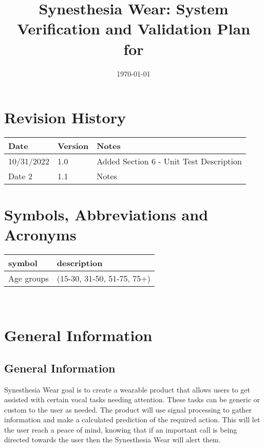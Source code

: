 \documentclass[12pt, titlepage]{article}
\begin{document}
\title{Synesthesia Wear: System Verification and Validation Plan for \progname{}} 
\author{\authname}
\date{\today}
	
\maketitle


\section{Revision History}

\begin{tabularx}{\textwidth}{p{3cm}p{2cm}X}
\toprule {\bf Date } & {\bf Version} & {\bf Notes}\\
\midrule
10/31/2022 & 1.0 & Added Section 6 - Unit Test Description\\
Date 2 & 1.1 & Notes\\
\bottomrule
\end{tabularx}

\newpage

\tableofcontents

\listoftables

\newpage

\section{Symbols, Abbreviations and Acronyms}

\renewcommand{\arraystretch}{1.2}
\begin{tabular}{l l} 
  \toprule		
  \textbf{symbol} & \textbf{description}\\
  \midrule 
  Age groups & (15-30, 31-50, 51-75, 75+)\\
  \bottomrule
\end{tabular}\\

\newpage


\section{General Information}

\subsection{General Information}

Synesthesia Wear goal is to create a wearable product that allows users to get assisted with certain vocal tasks needing attention. These tasks can be generic or custom to the user as needed. The product will use signal processing to gather information and make a calculated prediction of the required action. This will let the user reach a peace of mind, knowing that if an important call is being directed towards the user then the Synesthesia Wear will alert them.
\end{document}
